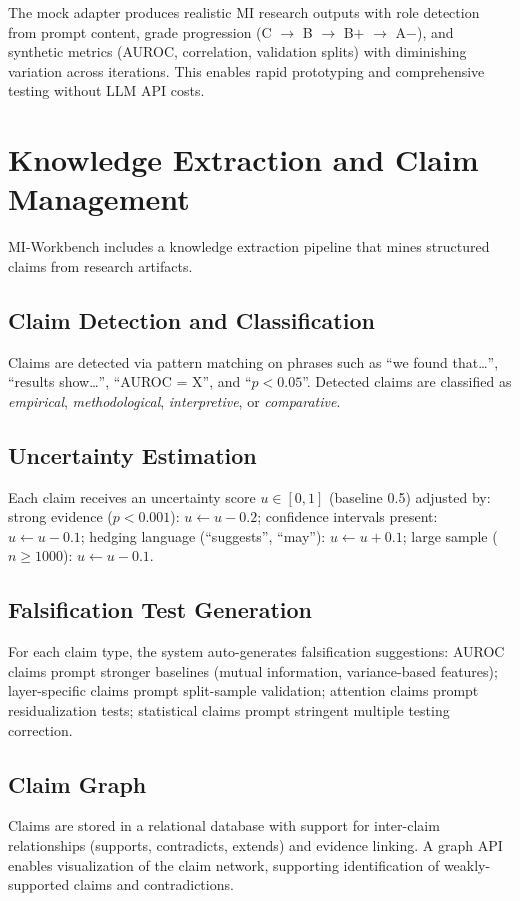 \documentclass[10pt]{article}
\begin{document}
The mock adapter produces realistic MI research outputs with role detection from prompt content, grade progression (C $\to$ B $\to$ B$+$ $\to$ A$-$), and synthetic metrics (AUROC, correlation, validation splits) with diminishing variation across iterations. This enables rapid prototyping and comprehensive testing without LLM API costs.


\section{Knowledge Extraction and Claim Management}
\label{sec:knowledge}

MI-Workbench includes a knowledge extraction pipeline that mines structured claims from research artifacts.

\subsection{Claim Detection and Classification}
Claims are detected via pattern matching on phrases such as ``we found that\ldots'', ``results show\ldots'', ``AUROC = X'', and ``$p < 0.05$''. Detected claims are classified as \emph{empirical}, \emph{methodological}, \emph{interpretive}, or \emph{comparative}.

\subsection{Uncertainty Estimation}
Each claim receives an uncertainty score $u \in [0, 1]$ (baseline 0.5) adjusted by: strong evidence ($p < 0.001$): $u \leftarrow u - 0.2$; confidence intervals present: $u \leftarrow u - 0.1$; hedging language (``suggests'', ``may''): $u \leftarrow u + 0.1$; large sample ($n \geq 1000$): $u \leftarrow u - 0.1$.

\subsection{Falsification Test Generation}
For each claim type, the system auto-generates falsification suggestions: AUROC claims prompt stronger baselines (mutual information, variance-based features); layer-specific claims prompt split-sample validation; attention claims prompt residualization tests; statistical claims prompt stringent multiple testing correction.

\subsection{Claim Graph}
Claims are stored in a relational database with support for inter-claim relationships (supports, contradicts, extends) and evidence linking. A graph API enables visualization of the claim network, supporting identification of weakly-supported claims and contradictions.
\end{document}
